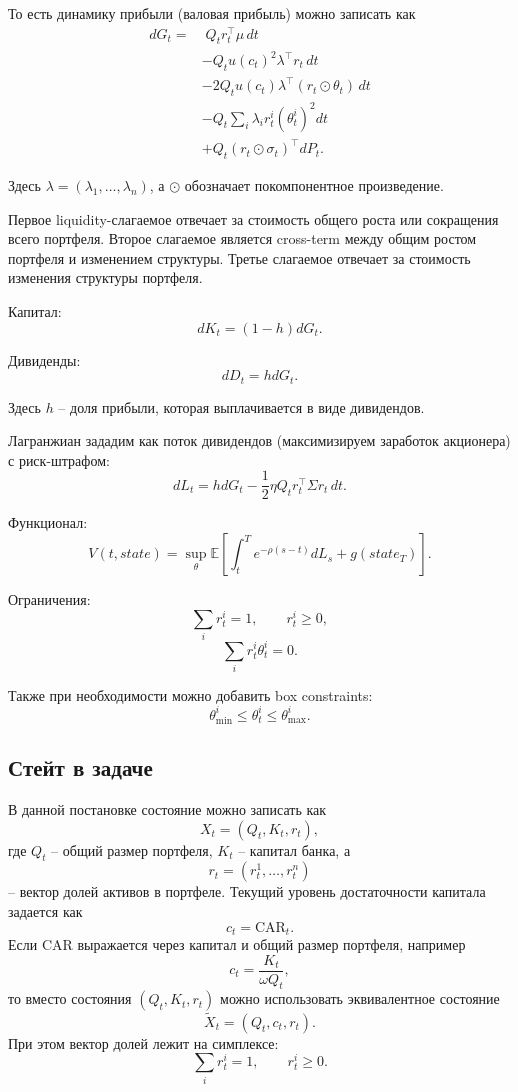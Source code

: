 \documentclass[12pt,a4paper]{article}
\begin{document}
То есть динамику прибыли (валовая прибыль) можно записать как
\[
\begin{aligned}
    dG_t
    =
    &\; Q_t r_t^\top \mu \, dt \\
    &- Q_t u(c_t)^2 \lambda^\top r_t \, dt \\
    &- 2Q_t u(c_t)\lambda^\top(r_t \odot \theta_t)\,dt \\
    &- Q_t\sum_i \lambda_i r_t^i(\theta_t^i)^2dt \\
    &+ Q_t (r_t \odot \sigma_t)^\top dP_t.
\end{aligned}
\]

Здесь $\lambda=(\lambda_1,\dots,\lambda_n)$, а $\odot$ обозначает покомпонентное произведение.

Первое liquidity-слагаемое отвечает за стоимость общего роста или сокращения всего портфеля. Второе слагаемое является cross-term между общим ростом портфеля и изменением структуры. Третье слагаемое отвечает за стоимость изменения структуры портфеля.

Капитал:
\[
    dK_t = (1-h)dG_t.
\]

Дивиденды:
\[
    dD_t = h dG_t.
\]

Здесь $h$ -- доля прибыли, которая выплачивается в виде дивидендов.

Лагранжиан зададим как поток дивидендов (максимизируем заработок акционера) с риск-штрафом:
\[
    dL_t
    =
    h dG_t
    -
    \frac{1}{2}\eta Q_t r_t^\top \Sigma r_t \, dt.
\]

Функционал:
\[
    V(t, state)
    =
    \sup_{\theta}
    \mathbb{E}
    \left[
        \int_t^T e^{-\rho(s-t)} dL_s
        +
        g(state_T)
    \right].
\]

Ограничения:
\[
    \sum_i r_t^i = 1,
    \qquad
    r_t^i \ge 0,
\]
\[
    \sum_i r_t^i\theta_t^i = 0.
\]

Также при необходимости можно добавить box constraints:
\[
    \theta_{\min}^i \le \theta_t^i \le \theta_{\max}^i.
\]

\subsection{Стейт в задаче}

В данной постановке состояние можно записать как
\[
    X_t = (Q_t, K_t, r_t),
\]
где $Q_t$ -- общий размер портфеля, $K_t$ -- капитал банка, а
\[
    r_t = (r_t^1,\dots,r_t^n)
\]
-- вектор долей активов в портфеле. Текущий уровень достаточности капитала задается как
\[
    c_t = \mathrm{CAR}_t.
\]
Если $\mathrm{CAR}$ выражается через капитал и общий размер портфеля, например
\[
    c_t = \frac{K_t}{\omega Q_t},
\]
то вместо состояния $(Q_t,K_t,r_t)$ можно использовать эквивалентное состояние
\[
    \widetilde X_t = (Q_t,c_t,r_t).
\]
При этом вектор долей лежит на симплексе:
\[
    \sum_i r_t^i = 1,
    \qquad
    r_t^i \ge 0.
\]
\end{document}
